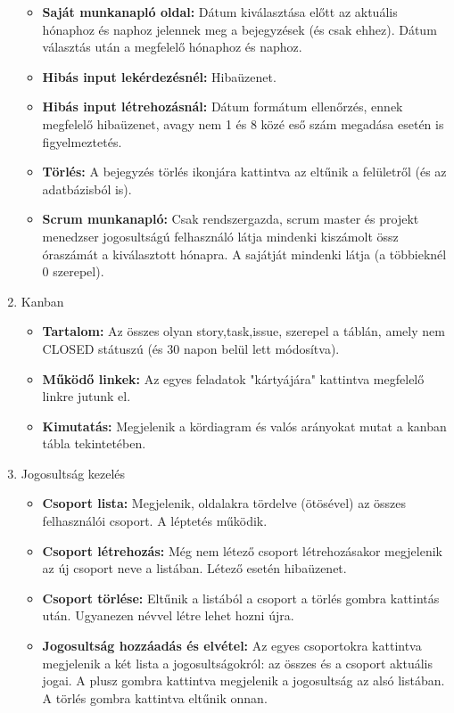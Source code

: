 \begin{enumerate}
	\begin{itemize}
		\item \textbf{Saját munkanapló oldal:} Dátum kiválasztása előtt az aktuális hónaphoz és naphoz jelennek meg a bejegyzések (és csak ehhez). Dátum választás után a megfelelő hónaphoz és naphoz.
		\item \textbf{Hibás input lekérdezésnél:}  Hibaüzenet.
		\item \textbf{Hibás input létrehozásnál:} Dátum formátum ellenőrzés, ennek megfelelő hibaüzenet, avagy nem 1 és 8 közé eső szám megadása esetén is figyelmeztetés.
		\item \textbf{Törlés:} A bejegyzés törlés ikonjára kattintva az eltűnik a felületről (és az adatbázisból is).
		\item \textbf{Scrum munkanapló:} Csak rendszergazda, scrum master és projekt menedzser jogosultságú felhasználó látja mindenki kiszámolt össz óraszámát a kiválasztott hónapra. A sajátját mindenki látja (a többieknél 0 szerepel).
	\end{itemize}
	\item Kanban
	\begin{itemize}
		\item \textbf{Tartalom:} Az összes olyan story,task,issue, szerepel a táblán, amely nem CLOSED státuszú (és 30 napon belül lett módosítva).
		\item \textbf{Működő linkek:} Az egyes feladatok "kártyájára" kattintva megfelelő linkre jutunk el.
		\item \textbf{Kimutatás:} Megjelenik a kördiagram és valós arányokat mutat a kanban tábla tekintetében.
	\end{itemize}
	\item Jogosultság kezelés
	\begin{itemize}
		\item \textbf{Csoport lista:} Megjelenik, oldalakra tördelve (ötösével) az összes felhasználói csoport. A léptetés működik.
		\item \textbf{Csoport létrehozás:} Még nem létező csoport létrehozásakor megjelenik az új csoport neve a listában. Létező esetén hibaüzenet.
		\item \textbf{Csoport törlése:} Eltűnik a listából a csoport a törlés gombra kattintás után. Ugyanezen névvel létre lehet hozni újra.
		\item \textbf{Jogosultság hozzáadás és elvétel:} Az egyes csoportokra kattintva megjelenik a két lista a jogosultságokról: az összes és a csoport aktuális jogai. A plusz gombra kattintva megjelenik a jogosultság az alsó listában. A törlés gombra kattintva eltűnik onnan.
	\end{itemize}
\end{enumerate}